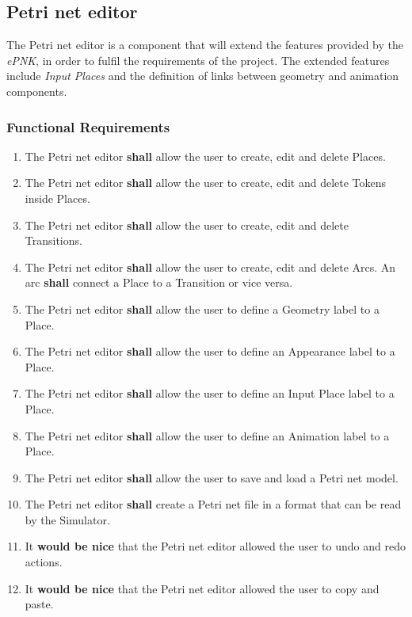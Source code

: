 \subsection{Petri net editor}
\label{sec:sf-petrinet}

The Petri net editor is a component that will extend the features provided by the \textit{ePNK}, in order to fulfil the requirements of the project. The extended features include \textit{Input Places} and the definition of links between geometry and animation components.

\subsubsection{Functional Requirements}

\begin{enumerate}
	\item The Petri net editor \textbf{shall} allow the user to create, edit and delete Places.
	\item The Petri net editor \textbf{shall} allow the user to create, edit and delete Tokens inside Places.
	\item The Petri net editor \textbf{shall} allow the user to create, edit and delete Transitions.
	\item The Petri net editor \textbf{shall} allow the user to create, edit and delete Arcs. An arc \textbf{shall} connect a Place to a Transition or vice versa.
	\item The Petri net editor \textbf{shall} allow the user to define a Geometry label to a Place.
	\item The Petri net editor \textbf{shall} allow the user to define an Appearance label to a Place.
	\item The Petri net editor \textbf{shall} allow the user to define an Input Place label to a Place.
	\item The Petri net editor \textbf{shall} allow the user to define an Animation label to a Place.
	\item The Petri net editor \textbf{shall} allow the user to save and load a Petri net model.
	\item The Petri net editor \textbf{shall} create a Petri net file in a format that can be read by the Simulator.
	\item It \textbf{would be nice} that the Petri net editor allowed the user to undo and redo actions.
	\item It \textbf{would be nice} that the Petri net editor allowed the user to copy and paste.
\end{enumerate}

